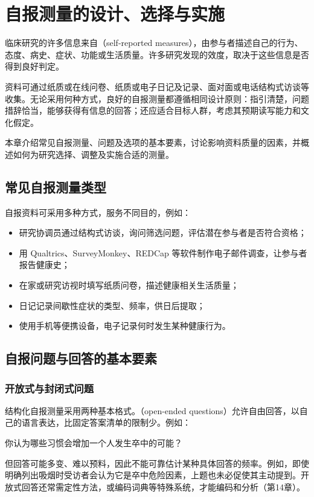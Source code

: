\chapter{自报测量的设计、选择与实施}
临床研究的许多信息来自（self-reported measures），由参与者描述自己的行为、态度、病史、症状、功能或生活质量。许多研究发现的效度，取决于这些信息是否得到良好判定。

资料可通过纸质或在线问卷、纸质或电子日记及记录、面对面或电话结构式访谈等收集。无论采用何种方式，良好的自报测量都遵循相同设计原则：指引清楚，问题措辞恰当，能够获得有信息的回答；还应适合目标人群，考虑其预期读写能力和文化假定。

本章介绍常见自报测量、问题及选项的基本要素，讨论影响资料质量的因素，并概述如何为研究选择、调整及实施合适的测量。

\section{常见自报测量类型}
自报资料可采用多种方式，服务不同目的，例如：
\begin{itemize}
\item 研究协调员通过结构式访谈，询问筛选问题，评估潜在参与者是否符合资格；
\item 用 Qualtrics、SurveyMonkey、REDCap 等软件制作电子邮件调查，让参与者报告健康史；
\item 在家或研究访视时填写纸质问卷，描述健康相关生活质量；
\item 日记记录间歇性症状的类型、频率，供日后提取；
\item 使用手机等便携设备，电子记录何时发生某种健康行为。
\end{itemize}

\section{自报问题与回答的基本要素}
\subsection{开放式与封闭式问题}
结构化自报测量采用两种基本格式。（open-ended questions）允许自由回答，以自己的语言表达，比固定答案清单的限制少。例如：
\begin{studyquote}你认为哪些习惯会增加一个人发生卒中的可能？\end{studyquote}
但回答可能多变、难以预料，因此不能可靠估计某种具体回答的频率。例如，即使明确列出吸烟时受访者会认为它是卒中危险因素，上题也未必促使其主动提到。开放式回答还常需定性方法，或编码词典等特殊系统，才能编码和分析（第14章）。

